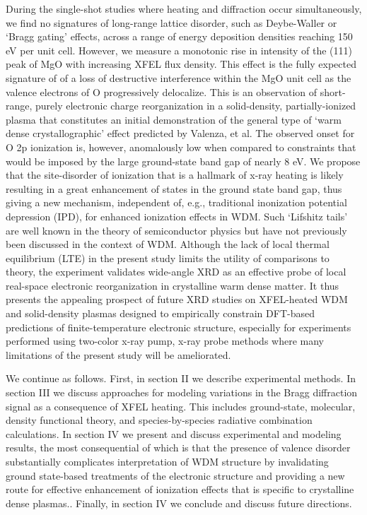 During the single-shot studies where heating and diffraction occur
simultaneously, we find no signatures of long-range lattice disorder,
such as Deybe-Waller or `Bragg gating' effects, across a range of energy
deposition densities reaching 150 eV per unit cell. However, we measure
a monotonic rise in intensity of the (111) peak of MgO with increasing
XFEL flux density. This effect is the fully expected signature of of a
loss of destructive interference within the MgO unit cell as the valence
electrons of O progressively delocalize. This is an observation of
short-range, purely electronic charge reorganization in a solid-density,
partially-ionized plasma that constitutes an initial demonstration of
the general type of `warm dense crystallographic' effect predicted by
Valenza, et al. \cite{VALENZA2016WARM} The observed onset for O 2p ionization is,
however, anomalously low when compared to constraints that would be
imposed by the large ground-state band gap of nearly 8 eV. We propose
that the site-disorder of ionization that is a hallmark of x-ray heating
is likely resulting in a great enhancement of states in the ground state
band gap, thus giving a new mechanism, independent of, e.g., traditional
inonization potential depression (IPD), for enhanced ionization effects
in WDM. Such `Lifshitz tails' are well known in the theory of
semiconductor physics but have not previously been discussed in the
context of WDM. Although the lack of local thermal equilibrium (LTE) in
the present study limits the utility of comparisons to theory, the
experiment validates wide-angle XRD as an effective probe of local
real-space electronic reorganization in crystalline warm dense matter.
It thus presents the appealing prospect of future XRD studies on
XFEL-heated WDM and solid-density plasmas designed to empirically
constrain DFT-based predictions of finite-temperature electronic
structure, especially for experiments performed using two-color x-ray
pump, x-ray probe methods where many limitations of the present study
will be ameliorated.

We continue as follows. First, in section II we describe experimental
methods. In section III we discuss approaches for modeling variations in
the Bragg diffraction signal as a consequence of XFEL heating. This
includes ground-state, molecular, density functional theory, and
species-by-species radiative combination calculations. In section IV we
present and discuss experimental and modeling results, the most
consequential of which is that the presence of valence disorder
substantially complicates interpretation of WDM structure by
invalidating ground state-based treatments of the electronic structure
and providing a new route for effective enhancement of ionization
effects that is specific to crystalline dense plasmas.. Finally, in
section IV we conclude and discuss future directions.

